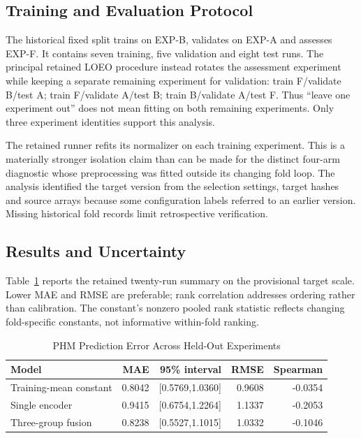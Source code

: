 \subsection{Training and Evaluation Protocol}
The historical fixed split trains on EXP-B, validates on EXP-A and assesses EXP-F. It contains seven training, five validation and eight test runs. The principal retained LOEO procedure instead rotates the assessment experiment while keeping a separate remaining experiment for validation: train F/validate B/test A; train F/validate A/test B; train B/validate A/test F. Thus ``leave one experiment out'' does not mean fitting on both remaining experiments. Only three experiment identities support this analysis.

The retained runner refits its normalizer on each training experiment. This is a materially stronger isolation claim than can be made for the distinct four-arm diagnostic whose preprocessing was fitted outside its changing fold loop. The analysis identified the target version from the selection settings, target hashes and source arrays because some configuration labels referred to an earlier version. Missing historical fold records limit retrospective verification.

\subsection{Results and Uncertainty}
Table~\ref{tab:phm-loeo} reports the retained twenty-run summary on the provisional target scale. Lower MAE and RMSE are preferable; rank correlation addresses ordering rather than calibration. The constant's nonzero pooled rank statistic reflects changing fold-specific constants, not informative within-fold ranking.

\begin{table}[htbp]
\caption{PHM Prediction Error Across Held-Out Experiments}\label{tab:phm-loeo}
\centering\small
\begin{tabular}{lrrrr}\toprule
Model & MAE & 95\% interval & RMSE & Spearman\\\midrule
Training-mean constant &0.8042 &[0.5769,1.0360]&0.9608&-0.0354\\
Single encoder &0.9415 &[0.6754,1.2264]&1.1337&-0.2053\\
Three-group fusion &0.8238 &[0.5527,1.1015]&1.0332&-0.1046\\\bottomrule
\end{tabular}
\end{table}

